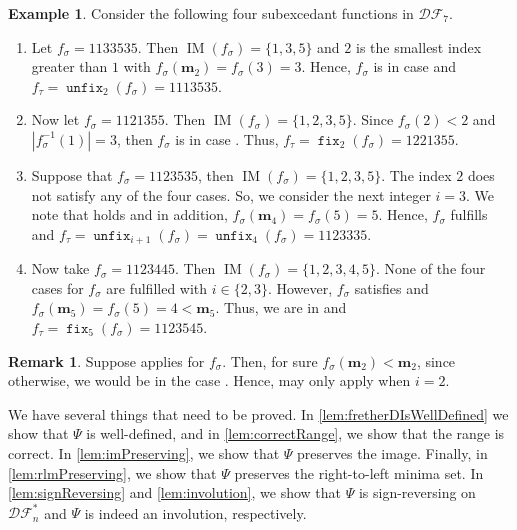 \documentclass[reqno]{amsart}
\theoremstyle{definition}
\newtheorem{example}[theorem]{Example}
\newtheorem{remark}[theorem]{Remark}
\newcommand{\DSEF}{\mathcal{DF}}%
\newcommand{\fretherD}{\Psi}
\newcommand{\img}{\mathbf{m}}
\DeclareMathOperator{\supp}{IM}
\DeclareMathOperator{\fixMap}{\mathtt{fix}}
\DeclareMathOperator{\unfixMap}{\mathtt{unfix}}
\begin{document}
\begin{example}\label{eg:main}
	Consider the following four subexcedant functions in $\DSEF_7$.
	\begin{enumerate}
		\item Let $f_\sigma=1133535$. Then 
		$\supp(f_\sigma)=\{1, 3, 5\}$ and 
		$2$ is the smallest index greater than 
		$1$ with
		$f_\sigma(\img_2)=f_\sigma(3)=3$. Hence, $f_\sigma$ is in case 
		\caseOne[2] and $f_\tau= 
		\unfixMap_2(f_\sigma)=1113535$.
		\item Now let $f_\sigma=1121355$. Then 
		$\supp(f_\sigma)=\{1, 2, 3, 5\}$. Since $f_\sigma(2)<2$ 
		and $|f_\sigma^{-1}(1)|=3$, then $f_\sigma$ is in case \caseTwo[2]. Thus, $f_\tau= 
		\fixMap_2(f_\sigma)=1221355$.
		\item Suppose that $f_\sigma=1123535$, then 
		$\supp(f_\sigma)=\{1, 2, 3, 5\}$. 
		The index $2$ does not satisfy any of the four cases. 
		So, we consider the next integer $i=3$. We note that \eqCond[3] holds and in 
		addition, 
		$f_\sigma(\img_{4})=f_\sigma(5)=5$. 
		Hence, $f_\sigma$ fulfills \caseThree[3]  and 
		$f_\tau= 
		\unfixMap_{i+1}(f_\sigma)=\unfixMap_{4}(f
		_\sigma)=1123335$.
		\item Now take $f_\sigma=1123445$. Then 
		$\supp(f_\sigma)=\{1, 2, 3, 4, 
		5\}$. None of the four cases for $f_\sigma$ are fulfilled 
		with $i\in\{2,3\}$. However, $f_\sigma$ 
		satisfies \eqCond[4] and 
		$f_\sigma(\img_{5})=f_\sigma(5)=4<\img_{5}$. 
		Thus, we are in \caseFour[4] and $f_\tau=\fixMap_{5}(f_\sigma)=1123545$.
	\end{enumerate}
\end{example}

\begin{remark}\label{rem:case2}
 Suppose \caseTwo[i] applies for $f_\sigma$.
 Then, for sure $f_\sigma(\img_2) < \img_2$, since otherwise, we would be in the case \caseOne[2]. 
 Hence, \caseTwo[i] may only apply when $i=2$.
\end{remark}



We have several things that need to be proved.
In \cref{lem:fretherDIsWellDefined} we show that $\fretherD$ is well-defined,
and in \cref{lem:correctRange}, we show that the range is correct.
%
In \cref{lem:imPreserving}, we show that $\fretherD$ preserves the image. Finally, in \cref{lem:rlmPreserving}, we show that $\fretherD$ preserves the right-to-left minima set.
In \cref{lem:signReversing} and \cref{lem:involution}, we show that  $\fretherD$ is sign-reversing on $\DSEF^*_n$ and $\fretherD$ is indeed an involution, respectively.
\smallskip
\end{document}
